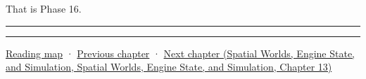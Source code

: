 That is Phase 16.

\begin{center}\rule{0.5\linewidth}{0.5pt}\end{center}

\begin{center}\rule{0.5\linewidth}{0.5pt}\end{center}

\hyperref[volume-reading-map]{Reading map} · \hyperref[05-engine-i-ch011-streaming-resources-through-explicit-states]{Previous chapter} · \href{../05-Spatial-Worlds-Engine-State-and-Simulation/main.pdf\#nameddest=05-engine-i-ch013-portable-startup-windows-events-and-input}{Next chapter (Spatial Worlds, Engine State, and Simulation, Spatial Worlds, Engine State, and Simulation, Chapter 13)}
